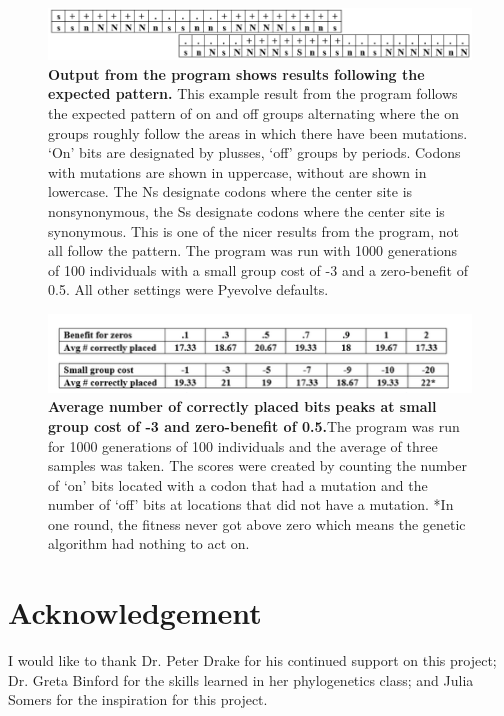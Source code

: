 \documentclass{article}
\begin{document}
\begin{figure}
    \centering
    \includegraphics{amelia_fig2.png}
    \caption{\textbf{Output from the program shows results following the expected pattern.}  This example result from the program follows the expected pattern of on and off groups alternating where the on groups roughly follow the areas in which there have been mutations. ‘On’ bits are designated by plusses, ‘off’ groups by periods. Codons with mutations are shown in uppercase, without are shown in lowercase.  The Ns designate codons where the center site is nonsynonymous, the Ss designate codons where the center site is synonymous. This is one of the nicer results from the program, not all follow the pattern.  The program was run with 1000 generations of 100 individuals with a small group cost of -3 and a zero-benefit of 0.5.  All other settings were Pyevolve defaults.}
    \label{fig:my_label}
\end{figure}

\begin{figure}
    \centering
    \includegraphics{amelia_fig3.png}
    \caption{\textbf{ Average number of correctly placed bits peaks at small group cost of -3 and zero-benefit of 0.5.}The program was run for 1000 generations of 100 individuals and the average of three samples was taken.  The scores were created by counting the number of ‘on’ bits located with a codon that had a mutation and the number of ‘off’ bits at locations that did not have a mutation.
*In one round, the fitness never got above zero which means the genetic algorithm had nothing to act on.
}
    \label{fig:my_label}
\end{figure}


\section{Acknowledgement}
I would like to thank Dr. Peter Drake for his continued support on this project; Dr. Greta Binford for the skills learned in her phylogenetics class; and Julia Somers for the inspiration for this project.
\end{document}
